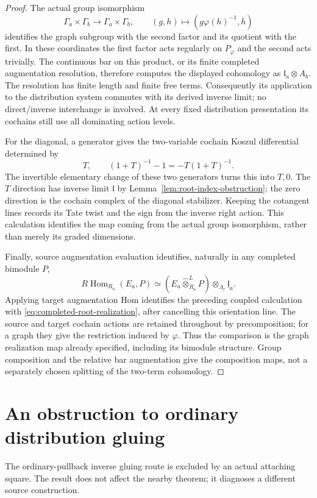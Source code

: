 \documentclass[11pt]{article}
\theoremstyle{definition}
\theoremstyle{remark}
\newcommand{\RHom}{R\operatorname{Hom}}
\begin{document}
\begin{proof}
The actual group isomorphism
\[
 \Gamma_a\times\Gamma_b\longrightarrow\Gamma_a\times\Gamma_b,
 \qquad (g,h)\longmapsto(g\varphi(h)^{-1},h)
\]
identifies the graph subgroup with the second factor and its
quotient with the first.  In these coordinates the first factor
acts regularly on $P_\varphi$ and the second acts trivially.
The continuous bar on this product, or its finite completed
augmentation resolution, therefore computes the displayed
cohomology as $\mathfrak l_a\otimes A_b$.  The resolution has
finite length and finite free terms.  Consequently its application
to the distribution system commutes with its derived inverse
limit; no direct/inverse interchange is involved.  At every fixed
distribution presentation its cochains still use all dominating
action levels.

For the diagonal, a generator gives the two-variable cochain
Koszul differential determined by
\[
 T,\qquad (1+T)^{-1}-1=-T(1+T)^{-1}.
\]
The invertible elementary change of these two generators turns
this into $T,0$.  The $T$ direction has inverse limit
$\mathfrak l$ by Lemma~\ref{lem:root-index-obstruction}; the zero
direction is the cochain complex of the diagonal stabilizer.
Keeping the cotangent lines records its Tate twist and the sign
from the inverse right action.  This calculation identifies the
map coming from the actual group isomorphism, rather than merely
its graded dimensions.

Finally, source augmentation evaluation identifies, naturally in
any completed bimodule $P$,
\[
 \RHom_{R_a}(E_a,P)
   \simeq (E_a\widehat\otimes_{R_a}^L P)
                  \otimes_{\Lambda_r}\underline{\mathfrak l}_a.
\]
Applying target augmentation Hom identifies the preceding coupled
calculation with \eqref{eq:completed-root-realization}, after
cancelling this orientation line.  The source and target cochain
actions are retained throughout by precomposition; for a graph
they give the restriction induced by $\varphi$.  Thus the comparison
is the graph realization map already specified, including its
bimodule structure.  Group composition and the relative bar
augmentation give the composition maps, not a separately chosen
splitting of the two-term cohomology.
\end{proof}

\section{An obstruction to ordinary distribution gluing}
\label{sec:root-obstruction}
The ordinary-pullback inverse gluing route is excluded by an actual
attaching square.  The result does not affect the nearby theorem;
it diagnoses a different source construction.
\end{document}
